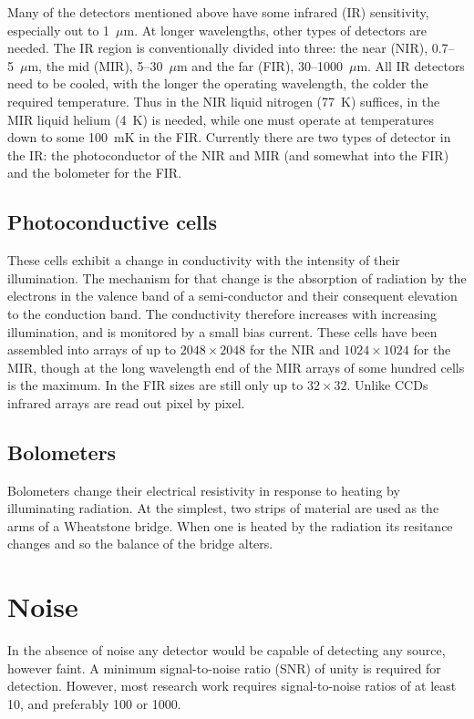 Many of the detectors mentioned above have some infrared (IR) sensitivity, 
especially out to 1~$\mu$m. At longer wavelengths, other types of detectors
are needed. The IR region is conventionally divided into three: the near
(NIR), 0.7--5~$\mu$m, the mid (MIR), 5--30~$\mu$m and the far (FIR), 
30--1000~$\mu$m. All IR detectors need to be cooled, with the longer the
operating wavelength, the colder the required temperature. Thus in the 
NIR liquid nitrogen (77~K) suffices, in the MIR liquid helium (4~K) is 
needed, while one must operate at temperatures down to some 100~mK in the 
FIR. Currently there are two types of detector in the IR: the photoconductor
of the NIR and MIR (and somewhat into the FIR) and the bolometer for the
FIR.

\subsection{Photoconductive cells}
These cells exhibit a change in conductivity with the 
intensity of their illumination. The mechanism for that change is the 
absorption of radiation by the electrons in the valence band of a 
semi-conductor and their consequent elevation to the conduction band. The
conductivity therefore increases with increasing illumination, and is monitored
by a small bias current. These cells have been assembled into arrays of 
up to $2048\times 2048$ for the NIR and $1024\times 1024$ for the MIR, 
though at the long wavelength end of the MIR arrays of some hundred cells is
the maximum. In the FIR sizes are still only up to $32\times 32$. Unlike
CCDs infrared arrays are read out pixel by pixel. 

\subsection{Bolometers}
Bolometers change their electrical
resistivity in response to heating by illuminating radiation. At the
simplest, two strips of material are used as the arms of a Wheatstone
bridge. When one is heated by the radiation its resitance changes and
so the balance of the bridge alters. 

\section{Noise}

In the absence of noise any detector would be capable of detecting any source,
however faint. A minimum signal-to-noise ratio (SNR) of unity is required for 
detection. However, most research work requires signal-to-noise ratios of
at least 10, and preferably 100 or 1000. 

